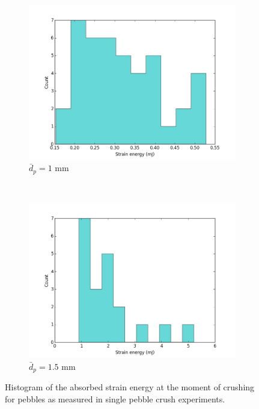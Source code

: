 \begin{figure}
        \centering
        \begin{subfigure}[b]{\doubleimagewidth}
                \includegraphics[width=\textwidth]{chapters/figures/nfri-1mm-w-histogram.png}
                \caption{$\bar{d}_p = 1$ mm}
                \label{fig:nfri-1-w-hist}
        \end{subfigure}
        ~
        \begin{subfigure}[b]{\doubleimagewidth}
                \includegraphics[width=\textwidth]{chapters/figures/nfri-1.5mm-w-histogram.png}
                \caption{$\bar{d}_p = 1.5$ mm}
                \label{fig:nfri-1.5-w-hist}
        \end{subfigure}
        \caption{Histogram of the absorbed strain energy at the moment of crushing for \lit pebbles as measured in single pebble crush experiments.}\label{fig:nfri-w-hist}
\end{figure}

